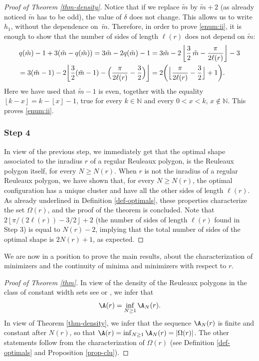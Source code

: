 \begin{proof}[Proof of Theorem \ref{thm-density}]
Notice that if we replace $\tilde{m}$ by $\tilde{m}+2$ (as already noticed $\tilde{m}$ has to be odd), the value of $\delta$ does not change. This allows us to write $h_1$, without the dependence on~$\tilde{m}$. Therefore, in order to prove \eqref{enum:ii}, it is enough to show that the number of sides of length $\ell(r)$ does not depend on $\tilde{m}$:
\begin{align*}
q (\tilde{m})-1+ 3 (\tilde{m}-q(\tilde{m})) = 3 \tilde{m} - 2 q(\tilde{m})-1 &= 3 \tilde{m} - 2 \left\lfloor \frac32\, \tilde{m} - \frac{\pi}{2\ell(r)} \right\rfloor - 3
\\ = 3 (\tilde{m}-1) - 2 \biggl\lfloor \frac32 (\tilde{m}-1) - \Bigl(\frac{\pi}{2\ell(r)} - \frac32 \Bigr) \biggr\rfloor &= 2 \biggl( \Bigl\lfloor \frac{\pi}{2\ell(r)} - \frac32 \Bigr\rfloor+ 1\biggr).
\end{align*}
Here we have used that $\tilde{m}-1$ is even, together with the equality $\left\lfloor k - x\right\rfloor= k -\left\lfloor x \right\rfloor - 1$, true for every $k\in \mathbb N$ and every $0<x<k$, $x\notin \mathbb N$. This proves \eqref{enum:ii}.

\subsubsection*{Step 4} In view of the previous step, we immediately get that the optimal shape associated to the inradius $r$ of a regular Reuleaux polygon, is the Reuleaux polygon itself, for every $N\geq N(r)$. When $r$ is not the inradius of a regular Reuleaux polygon, we have shown that, for every $N\geq N(r)$, the optimal configuration has a unique cluster and have all the other sides of length $\ell(r)$. As already underlined in Definition \ref{def-optimals}, these properties characterize the set $ \Omega(r)$, and the proof of the theorem is concluded. Note that $2 \left\lfloor \pi/(2\ell(r))- 3/2\right\rfloor+2$ (\ie the number of sides of length $\ell(r)$ found in Step 3) is equal to $N(r)-2$, implying that the total number of sides of the optimal shape is $2N(r)+1$, as expected.
\end{proof}

We are now in a position to prove the main results, about the characterization of minimizers and the continuity of minima and minimizers with respect to $r$.
\begin{proof}[Proof of Theorem \ref{thm}]
In view of the density of the Reuleaux polygons in the class of constant width sets see \cite{BF} or \cite{Buc}, we infer that
\[
\A(r)=\inf_{ {N\geq 1}} \A_N(r).
\]
In view of Theorem \ref{thm-density}, we infer that the sequence $\A_N(r)$ is finite and constant after $N(r)$, so that $\A(r)=\inf_{ {N\geq 1}}\A_N(r)=|\Omega(r)|$. The other statements follow from the characterization of $\Omega(r)$ (see Definition \ref{def-optimals} and Proposition \ref{prop-clu}).
\end{proof}

